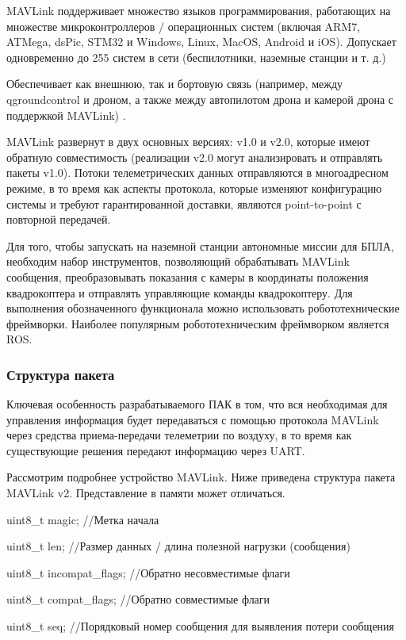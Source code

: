 MAVLink поддерживает множество языков программирования, работающих на множестве микроконтроллеров / операционных систем (включая ARM7, ATMega, dsPic, STM32 и Windows, Linux, MacOS, Android и iOS). Допускает одновременно до 255 систем в сети (беспилотники, наземные станции и т. д.)

Обеспечивает как внешнюю, так и бортовую связь (например, между q\-ground\-con\-trol и дроном, а также между автопилотом дрона и камерой дрона с поддержкой MAVLink) \cite{mavlink}.

MAVLink развернут в двух основных версиях: v1.0 и v2.0, которые имеют обратную совместимость (реализации v2.0 могут анализировать и отправлять пакеты v1.0). Потоки телеметрических данных отправляются в многоадресном режиме, в то время как аспекты протокола, которые изменяют конфигурацию системы и требуют гарантированной доставки, являются point-to-point с повторной передачей.


Для того, чтобы запускать на наземной станции автономные миссии для БПЛА, необходим набор инструментов, позволяющий обрабатывать MAVLink сообщения, преобразовывать показания с камеры в координаты положения квадрокоптера и отправлять управляющие команды квадрокоптеру. Для выполнения обозначенного функционала можно использовать робототехнические фреймворки. Наиболее популярным робототехническим фреймворком является ROS.
\subsubsection{Структура пакета}
Ключевая особенность разрабатываемого ПАК в том, что вся необходимая для управления информация будет передаваться с помощью протокола MAVLink через средства приема-передачи телеметрии по воздуху, в то время как существующие решения передают информацию через UART.

Рассмотрим подробнее устройство MAVLink. Ниже приведена структура пакета MAVLink v2. Представление в памяти может отличаться.

uint8\_t magic;              //Метка начала

uint8\_t len;                //Размер данных / длина полезной нагрузки (сообщения)

uint8\_t incompat\_flags;     //Обратно несовместимые флаги

uint8\_t compat\_flags;       //Обратно совместимые флаги

uint8\_t seq;                //Порядковый номер сообщения для выявления потери сообщения

